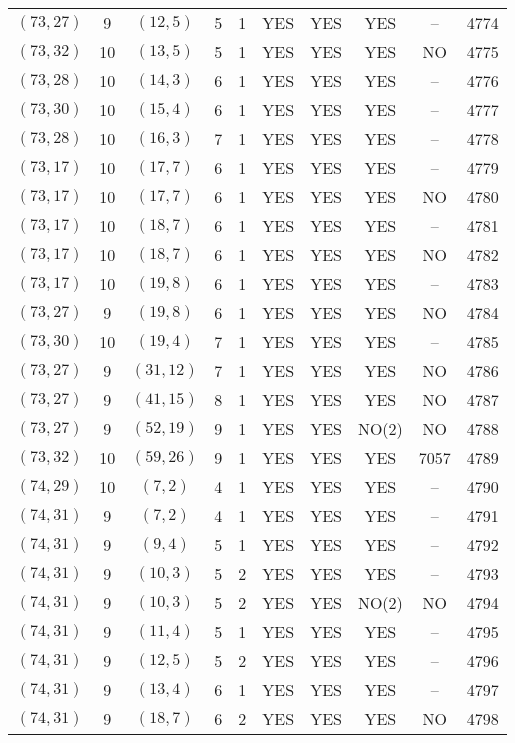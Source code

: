 \begin{longtable}{|c|c|c|c|c|c|c|c|c|c|}
$(73, 27)$ & 9 & $(12, 5)$ & 5 & 1 & YES & YES & YES & -- & 4774\\
$(73, 32)$ & 10 & $(13, 5)$ & 5 & 1 & YES & YES & YES & NO & 4775\\
$(73, 28)$ & 10 & $(14, 3)$ & 6 & 1 & YES & YES & YES & -- & 4776\\
$(73, 30)$ & 10 & $(15, 4)$ & 6 & 1 & YES & YES & YES & -- & 4777\\
$(73, 28)$ & 10 & $(16, 3)$ & 7 & 1 & YES & YES & YES & -- & 4778\\
$(73, 17)$ & 10 & $(17, 7)$ & 6 & 1 & YES & YES & YES & -- & 4779\\
$(73, 17)$ & 10 & $(17, 7)$ & 6 & 1 & YES & YES & YES & NO & 4780\\
$(73, 17)$ & 10 & $(18, 7)$ & 6 & 1 & YES & YES & YES & -- & 4781\\
$(73, 17)$ & 10 & $(18, 7)$ & 6 & 1 & YES & YES & YES & NO & 4782\\
$(73, 17)$ & 10 & $(19, 8)$ & 6 & 1 & YES & YES & YES & -- & 4783\\
$(73, 27)$ & 9 & $(19, 8)$ & 6 & 1 & YES & YES & YES & NO & 4784\\
$(73, 30)$ & 10 & $(19, 4)$ & 7 & 1 & YES & YES & YES & -- & 4785\\
$(73, 27)$ & 9 & $(31, 12)$ & 7 & 1 & YES & YES & YES & NO & 4786\\
$(73, 27)$ & 9 & $(41, 15)$ & 8 & 1 & YES & YES & YES & NO & 4787\\
$(73, 27)$ & 9 & $(52, 19)$ & 9 & 1 & YES & YES & NO(2) & NO & 4788\\
$(73, 32)$ & 10 & $(59, 26)$ & 9 & 1 & YES & YES & YES & 7057 & 4789\\
$(74, 29)$ & 10 & $(7, 2)$ & 4 & 1 & YES & YES & YES & -- & 4790\\
$(74, 31)$ & 9 & $(7, 2)$ & 4 & 1 & YES & YES & YES & -- & 4791\\
$(74, 31)$ & 9 & $(9, 4)$ & 5 & 1 & YES & YES & YES & -- & 4792\\
$(74, 31)$ & 9 & $(10, 3)$ & 5 & 2 & YES & YES & YES & -- & 4793\\
$(74, 31)$ & 9 & $(10, 3)$ & 5 & 2 & YES & YES & NO(2) & NO & 4794\\
$(74, 31)$ & 9 & $(11, 4)$ & 5 & 1 & YES & YES & YES & -- & 4795\\
$(74, 31)$ & 9 & $(12, 5)$ & 5 & 2 & YES & YES & YES & -- & 4796\\
$(74, 31)$ & 9 & $(13, 4)$ & 6 & 1 & YES & YES & YES & -- & 4797\\
$(74, 31)$ & 9 & $(18, 7)$ & 6 & 2 & YES & YES & YES & NO & 4798\\

\end{longtable}
